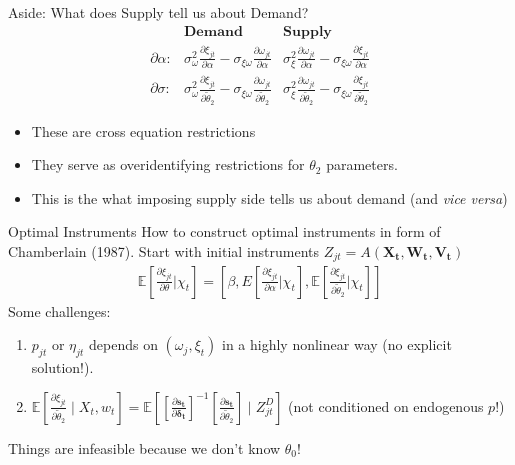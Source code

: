 \documentclass[aspectratio=169,11pt]{beamer}
\newcommand{\del}{\partial}
\begin{document}
\begin{frame}{Aside: What does Supply tell us about Demand?}
\begin{align*}
& \textbf{Demand} & \textbf{Supply} \\
\del \alpha:& 
        \sigma_\omega^2 \frac{\partial \xi_{jt}}{\partial \alpha} - 
        \sigma_{\xi\omega}\frac{\partial \omega_{jt}}{\partial \alpha} 
        & \sigma_{\xi}^2 \frac{\partial \omega_{jt}}{\partial \alpha}  - 
        \sigma_{\xi\omega}\frac{\partial \xi_{jt}}{\partial \alpha}  \\
\del \sigma:& 
        \sigma_\omega^2 \frac{\partial \xi_{jt}}{\partial \widetilde{\theta}_2}  -
        \sigma_{\xi\omega}\frac{\partial \omega_{jt}}{\partial \widetilde{\theta}_2} 
        & \sigma_{\xi}^2 \frac{\partial \omega_{jt}}{\partial \widetilde{\theta}_2} - 
        \sigma_{\xi\omega}\frac{\partial \xi_{jt}}{\partial \widetilde{\theta}_2}
\end{align*}
\begin{itemize}
\item These are \alert{cross equation restrictions}
\item They serve as \alert{overidentifying restrictions} for $\theta_2$ parameters.
\item This is the what imposing supply side tells us about demand (and \textit{vice versa})
\end{itemize}
\end{frame}


\begin{frame}{Optimal Instruments}
How to construct optimal instruments in form of Chamberlain (1987). Start with initial instruments $Z_{jt}=A\left(\symbf{X_t},\symbf{W_t},\symbf{V_t}\right)$
\begin{eqnarray*}
\mathbb{E}\left[\frac{\partial \xi_{jt}}{\partial \theta} | \chi_{t} \right] = \left[\beta, E\left[\frac{\partial \xi_{jt}}{\partial \alpha} | \chi_{t} \right] ,
 \mathbb{E}\left[\frac{\partial \xi_{jt}}{\partial \widetilde{\theta}_2} | \chi_{t} \right] \right]
\end{eqnarray*}
Some challenges:
\begin{enumerate}
\item $p_{jt}$ or $\eta_{jt}$ depends on $(\omega_{j},\xi_{t})$ in a highly nonlinear way (no explicit solution!).
\item $\mathbb{E}\left[\frac{\partial \xi_{jt}}{\partial \widetilde{\theta}_2} \mid X_t, w_{t} \right] =\mathbb{E}\left[\left[\frac{\partial \symbf{s_t}}{\partial \symbf{\delta_t}}\right]^{-1} 
\left[\frac{\partial \symbf{s_t}}{\partial \widetilde{\theta}_2}\right] \mid Z_{jt}^D \right]$  (not conditioned on endogenous $p$!)
\end{enumerate}
Things are \alert{infeasible} because we don't know $\theta_0$!
\end{frame}
\end{document}
